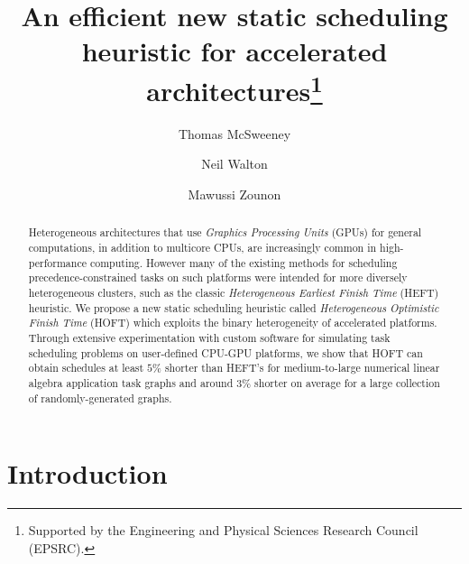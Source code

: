 \documentclass[runningheads]{llncs}
\begin{document}
%
\title{An efficient new static scheduling heuristic for accelerated architectures\thanks{Supported by the Engineering and Physical Sciences Research Council (EPSRC).}}
%
%
\author{Thomas McSweeney \and Neil Walton \and Mawussi Zounon }
%
%

%
\maketitle              %
%
\begin{abstract}

Heterogeneous architectures that use {\em Graphics Processing Units} (GPUs) for general computations, in addition to multicore CPUs, are increasingly common in high-performance computing. However many of the existing methods for scheduling precedence-constrained tasks on such platforms were intended for more diversely heterogeneous clusters, such as the classic {\em Heterogeneous Earliest Finish Time} (HEFT) heuristic. We propose a new static scheduling heuristic called {\em Heterogeneous Optimistic Finish Time} (HOFT) which exploits the binary heterogeneity of accelerated platforms. Through extensive experimentation with custom software for simulating task scheduling problems on user-defined CPU-GPU platforms, we show that HOFT can obtain schedules at least $5\%$ shorter than HEFT's for medium-to-large numerical linear algebra application task graphs and around $3\%$ shorter on average for a large collection of randomly-generated graphs.   


\end{abstract}


\section{Introduction}
\label{sect.intro}
\end{document}
